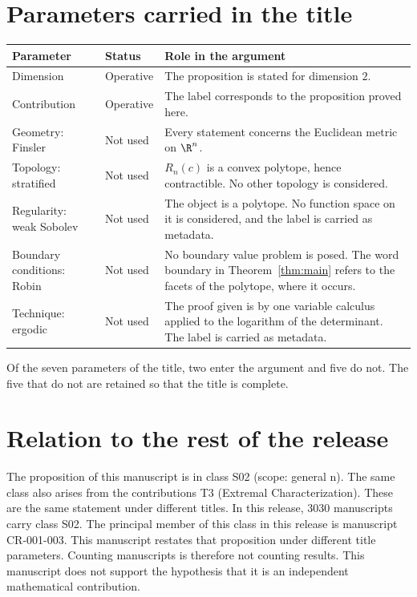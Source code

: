 \documentclass[11pt]{article}
\begin{document}
\section{Parameters carried in the title}\label{sec:params}
\begin{center}
\small
\begin{tabular}{p{}p{}p{}}
\toprule
Parameter & Status & Role in the argument \\
\midrule
Dimension & Operative & The proposition is stated for dimension $2$. \\
Contribution & Operative & The label corresponds to the proposition proved here. \\
Geometry: Finsler & Not used & Every statement concerns the Euclidean metric on $\R^n$. \\
Topology: stratified & Not used & $R_n(c)$ is a convex polytope, hence contractible. No other topology is considered. \\
Regularity: weak Sobolev & Not used & The object is a polytope. No function space on it is considered, and the label is carried as metadata. \\
Boundary conditions: Robin & Not used & No boundary value problem is posed. The word boundary in Theorem~\ref{thm:main} refers to the facets of the polytope, where it occurs. \\
Technique: ergodic & Not used & The proof given is by one variable calculus applied to the logarithm of the determinant. The label is carried as metadata. \\
\bottomrule
\end{tabular}
\end{center}
Of the seven parameters of the title, two enter the argument and five do not. The five that do not are retained so that the title is complete.

\section{Relation to the rest of the release}
The proposition of this manuscript is in class S02 (scope: general n). The same class also arises from the contributions T3 (Extremal Characterization). These are the same statement under different titles.
In this release, 3030 manuscripts carry class S02. The principal member of this class in this release is manuscript CR-001-003. This manuscript restates that proposition under different title parameters.
Counting manuscripts is therefore not counting results. This manuscript does not support the hypothesis that it is an independent mathematical contribution.
\end{document}
